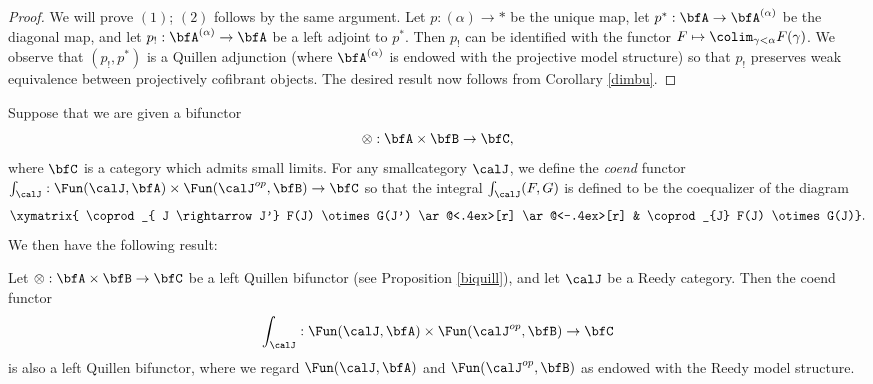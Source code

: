 \begin{proof}
We will prove $(1)$; $(2)$ follows by the same argument. Let $p: (\alpha) \rightarrow \ast$ be
the unique map, let $p^{\ast}: \bfA \rightarrow \bfA^{(\alpha)}$ be the diagonal map, and let
$p_{!}: \bfA^{(\alpha)} \rightarrow \bfA$ be a left adjoint to $p^{\ast}$. Then $p_{!}$ can be identified with the functor $F \mapsto \colim_{\gamma < \alpha} F(\gamma)$. We observe that $(p_!, p^{\ast})$ is a Quillen adjunction (where
$\bfA^{(\alpha)}$ is endowed with the projective model structure) so that
$p_{!}$ preserves weak equivalence between projectively cofibrant objects. The desired result now follows from Corollary \ref{dimbu}.
\end{proof}

Suppose that we are given a bifunctor
$$ \otimes: \bfA \times \bfB \rightarrow \bfC, $$
where $\bfC$ is a category which admits small limits. For any smallcategory $\calJ$, we define the
{\em coend} functor $\int_{\calJ}: \Fun(\calJ, \bfA) \times \Fun( \calJ^{op}, \bfB) \rightarrow \bfC$
so that the integral $\int_{\calJ}(F,G)$ is defined to be the coequalizer of the diagram
$$\xymatrix{ \coprod_{ J \rightarrow J'} F(J) \otimes G(J') 
\ar@<.4ex>[r] \ar@<-.4ex>[r] & \coprod_{J} F(J) \otimes G(J)}.$$
We then have the following result:

\begin{proposition}\label{intreed}
Let $\otimes: \bfA \times \bfB \rightarrow \bfC$ be a left Quillen bifunctor
(see Proposition \ref{biquill}), and let $\calJ$ be a Reedy category. Then the
coend functor
$$ \int_{\calJ}: \Fun( \calJ, \bfA) \times \Fun( \calJ^{op}, \bfB) \rightarrow \bfC$$
is also a left Quillen bifunctor, where we regard $\Fun(\calJ, \bfA)$ and
$\Fun(\calJ^{op}, \bfB)$ as endowed with the Reedy model structure.
\end{proposition}

